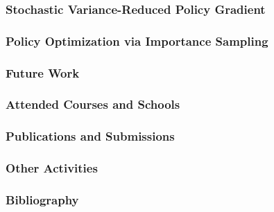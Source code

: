 \documentclass{beamer}
\begin{document}
\begin{frame}
\frametitle{Stochastic Variance-Reduced Policy Gradient}


\end{frame}


\begin{frame}
\frametitle{Policy Optimization via Importance Sampling}


\end{frame}


\begin{frame}
\frametitle{Future Work}


\end{frame}


\begin{frame}
\frametitle{Attended Courses and Schools}


\end{frame}


\begin{frame}
\frametitle{Publications and Submissions}


\end{frame}


\begin{frame}
\frametitle{Other Activities}


\end{frame}


\begin{frame}
\frametitle{Bibliography}


\end{frame}

\end{document}

